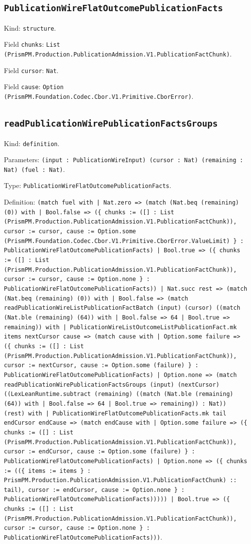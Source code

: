 \documentclass[11pt]{article}
\begin{document}
\subsection*{\texttt{PublicationWireFlatOutcomePublicationFacts}}
\noindent Kind: \texttt{structure}.\par
\noindent Field \texttt{chunks}: \texttt{List (PrismPM.Production.PublicationAdmission.V1.PublicationFactChunk)}.\par
\noindent Field \texttt{cursor}: \texttt{Nat}.\par
\noindent Field \texttt{cause}: \texttt{Option (PrismPM.Foundation.Codec.Cbor.V1.Primitive.CborError)}.\par
\subsection*{\texttt{readPublicationWirePublicationFactsGroups}}
\noindent Kind: \texttt{definition}.\par
\noindent Parameters: \texttt{(input : PublicationWireInput) (cursor : Nat) (remaining : Nat) (fuel : Nat)}.\par
\noindent Type: \texttt{PublicationWireFlatOutcomePublicationFacts}.\par
\noindent Definition: \texttt{(match fuel with | Nat.zero => (match (Nat.beq (remaining) (0)) with | Bool.false => (\{ chunks := ([] : List (PrismPM.Production.PublicationAdmission.V1.PublicationFactChunk)), cursor := cursor, cause := Option.some (PrismPM.Foundation.Codec.Cbor.V1.Primitive.CborError.ValueLimit) \} : PublicationWireFlatOutcomePublicationFacts) | Bool.true => (\{ chunks := ([] : List (PrismPM.Production.PublicationAdmission.V1.PublicationFactChunk)), cursor := cursor, cause := Option.none \} : PublicationWireFlatOutcomePublicationFacts)) | Nat.succ rest => (match (Nat.beq (remaining) (0)) with | Bool.false => (match readPublicationWireListPublicationFactBatch (input) (cursor) ((match (Nat.ble (remaining) (64)) with | Bool.false => 64 | Bool.true => remaining)) with | PublicationWireListOutcomeListPublicationFact.mk items nextCursor cause => (match cause with | Option.some failure => (\{ chunks := ([] : List (PrismPM.Production.PublicationAdmission.V1.PublicationFactChunk)), cursor := nextCursor, cause := Option.some (failure) \} : PublicationWireFlatOutcomePublicationFacts) | Option.none => (match readPublicationWirePublicationFactsGroups (input) (nextCursor) ((LexLeanRuntime.subtract (remaining) ((match (Nat.ble (remaining) (64)) with | Bool.false => 64 | Bool.true => remaining)) : Nat)) (rest) with | PublicationWireFlatOutcomePublicationFacts.mk tail endCursor endCause => (match endCause with | Option.some failure => (\{ chunks := ([] : List (PrismPM.Production.PublicationAdmission.V1.PublicationFactChunk)), cursor := endCursor, cause := Option.some (failure) \} : PublicationWireFlatOutcomePublicationFacts) | Option.none => (\{ chunks := ((\{ items := items \} : PrismPM.Production.PublicationAdmission.V1.PublicationFactChunk) :: tail), cursor := endCursor, cause := Option.none \} : PublicationWireFlatOutcomePublicationFacts))))) | Bool.true => (\{ chunks := ([] : List (PrismPM.Production.PublicationAdmission.V1.PublicationFactChunk)), cursor := cursor, cause := Option.none \} : PublicationWireFlatOutcomePublicationFacts)))}.\par
\end{document}
